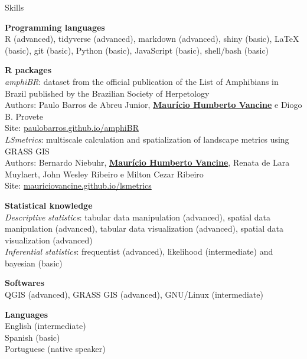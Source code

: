 \documentclass{resume}
\begin{document}

\begin{rSection}{Skills}

{\bf Programming languages}
\\ R (advanced), tidyverse (advanced), markdown (advanced), shiny (basic), LaTeX (basic), git (basic), Python (basic), JavaScript (basic), shell/bash (basic)

{\bf R packages}
\\ {\it amphiBR}: dataset from the official publication of the List of Amphibians in Brazil published by the Brazilian Society of Herpetology
\\ Authors: Paulo Barros de Abreu Junior, \underline{\bf Maurício Humberto Vancine} e Diogo B. Provete
\\ Site: \href{https://paulobarros.github.io/amphiBR}{paulobarros.github.io/amphiBR}
\\ {\it LSmetrics}: multiscale calculation and spatialization of landscape metrics using GRASS GIS  
\\ Authors: Bernardo Niebuhr, \underline{\bf Maurício Humberto Vancine}, Renata de Lara Muylaert, John Wesley Ribeiro e Milton Cezar Ribeiro
\\ Site: \href{https://mauriciovancine.github.io/lsmetrics}{mauriciovancine.github.io/lsmetrics}

{\bf Statistical knowledge}
\\ {\it Descriptive statistics}: tabular data manipulation (advanced), spatial data manipulation (advanced), tabular data visualization (advanced), spatial data visualization (advanced)
\\ {\it Inferential statistics}: frequentist (advanced), likelihood (intermediate) and bayesian (basic)

{\bf Softwares}
\\ QGIS (advanced), GRASS GIS (advanced), GNU/Linux (intermediate)

{\bf Languages}
\\ English (intermediate)
\\ Spanish (basic)
\\ Portuguese (native speaker)

\end{rSection}

\end{document}
